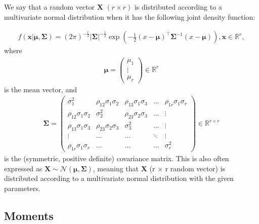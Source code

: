 We say that a random vector $\bm{X}$ $(r \times r)$
is distributed according to a multivariate normal distribution
when it has the following joint density function\autocite[p. 59]{izenman_modern_2008}:
\begin{definition}
	\begin{align}
		f(\bm{x}| \bm{\mu}, \bm{\Sigma})
		= (2\pi)^{-\frac{r}{2}}
		\left|\bm{\Sigma}\right|^{-\frac{1}{2}}
		\exp\left(-\frac{1}{2}(x-\bm{\mu})^\top \bm{\Sigma}^{-1} (x-\bm{\mu})\right),
		\bm{x} \in \mathbb{R}^r,
	\end{align}
	where
	\begin{align}
		\bm{\mu} =
		\begin{pmatrix}
			\mu_1  \\
			\vdots \\
			\mu_r
		\end{pmatrix}
		\in \mathbb{R}^r
	\end{align}
	is the mean vector, and
	\begin{align}
		\bm{\Sigma} =
		\begin{pmatrix}
			\sigma_1^2                & \rho_{12}\sigma_1\sigma_2 & \rho_{13}\sigma_1\sigma_3 & \ldots & \rho_{1r}\sigma_1\sigma_r \\
			\rho_{12}\sigma_1\sigma_2 & \sigma_2^2                & \rho_{23}\sigma_2\sigma_3 & \ldots & \vdots                    \\
			\rho_{13}\sigma_1\sigma_3 & \rho_{23}\sigma_2\sigma_3 & \sigma_3^2                & \ldots & \vdots                    \\
			\vdots                    & \ldots                    & \ldots                    & \ddots & \vdots                    \\
			\rho_{1r}\sigma_1\sigma_r & \ldots                    & \ldots                    & \ldots & \sigma_r^2
		\end{pmatrix}
		\in \mathbb{R}^{r\times r}
	\end{align}
	is the (symmetric, positive definite) covariance matrix.
	This is also often expressed as $\bm{X} \sim \mathcal{N}(\bm{\mu}, \bm{\Sigma})$,
	meaning that $\bm{X}$ (r $\times$ r random vector) is distributed
	according to a multivariate normal distribution with the given parameters.
\end{definition}

\subsection{Moments}\label{subsec:moments}

